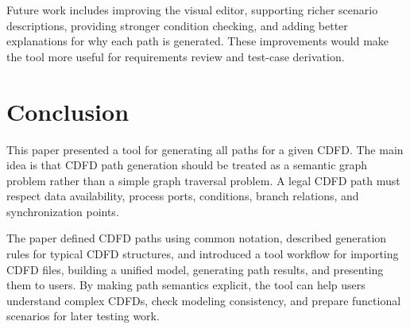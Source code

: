 \documentclass[conference]{template/IEEEtran}
\begin{document}
Future work includes improving the visual editor, supporting richer scenario descriptions, providing stronger condition checking, and adding better explanations for why each path is generated. These improvements would make the tool more useful for requirements review and test-case derivation.

\section{Conclusion}

This paper presented a tool for generating all paths for a given CDFD. The main idea is that CDFD path generation should be treated as a semantic graph problem rather than a simple graph traversal problem. A legal CDFD path must respect data availability, process ports, conditions, branch relations, and synchronization points.

The paper defined CDFD paths using common notation, described generation rules for typical CDFD structures, and introduced a tool workflow for importing CDFD files, building a unified model, generating path results, and presenting them to users. By making path semantics explicit, the tool can help users understand complex CDFDs, check modeling consistency, and prepare functional scenarios for later testing work.



\end{document}
